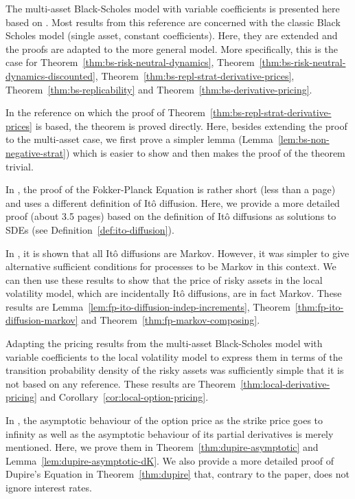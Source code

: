 \documentclass[english]{article}
\numberwithin{equation}{section}
\numberwithin{figure}{section}
\theoremstyle{bolddescit}
\theoremstyle{definition}
\theoremstyle{definition}
\theoremstyle{plain}
\theoremstyle{plain}
\theoremstyle{bolddesc}
\theoremstyle{plain}
\theoremstyle{remark}
\begin{document}
The multi-asset Black-Scholes model with variable coefficients is presented here based on \textcite{capinski_blackscholes_2012}. Most results from this reference are concerned with the classic Black Scholes model (single asset, constant coefficients). Here, they are extended and the proofs are adapted to the more general model. More specifically, this is the case for Theorem~\ref{thm:bs-risk-neutral-dynamics}, Theorem~\ref{thm:bs-risk-neutral-dynamics-discounted}, Theorem~\ref{thm:bs-repl-strat-derivative-prices}, Theorem~\ref{thm:bs-replicability} and Theorem~\ref{thm:bs-derivative-pricing}.

In the reference on which the proof of Theorem~\ref{thm:bs-repl-strat-derivative-prices} is based, the theorem is proved directly. Here, besides extending the proof to the multi-asset case, we first prove a simpler lemma (Lemma~\ref{lem:bs-non-negative-strat}) which is easier to show and then makes the proof of the theorem trivial.

In \textcite{pavliotis_stochastic_2014}, the proof of the Fokker-Planck Equation is rather short (less than a page) and uses a different definition of It\^o diffusion. Here, we provide a more detailed proof (about 3.5 pages) based on the definition of It\^o diffusions as solutions to SDEs (see Definition~\ref{def:ito-diffusion}).

In \textcite{oksendal_stochastic_2003}, it is shown that all It\^o diffusions are Markov. However, it was simpler to give alternative sufficient conditions for processes to be Markov in this context. We can then use these results to show that the price of risky assets in the local volatility model, which are incidentally It\^o diffusions, are in fact Markov. These results are Lemma~\ref{lem:fp-ito-diffusion-indep-increments}, Theorem~\ref{thm:fp-ito-diffusion-markov} and Theorem~\ref{thm:fp-markov-composing}.

Adapting the pricing results from the multi-asset Black-Scholes model with variable coefficients to the local volatility model to express them in terms of the transition probability density of the risky assets was sufficiently simple that it is not based on any reference. These results are Theorem~\ref{thm:local-derivative-pricing} and Corollary~\ref{cor:local-option-pricing}.

In \textcite{dupire_pricing_1993}, the asymptotic behaviour of the option price as the strike price goes to infinity as well as the asymptotic behaviour of its partial derivatives is merely mentioned. Here, we prove them in Theorem~\ref{thm:dupire-asymptotic} and Lemma~\ref{lem:dupire-asymptotic-dK}. We also provide a more detailed proof of Dupire's Equation in Theorem~\ref{thm:dupire} that, contrary to the paper, does not ignore interest rates.
\end{document}
